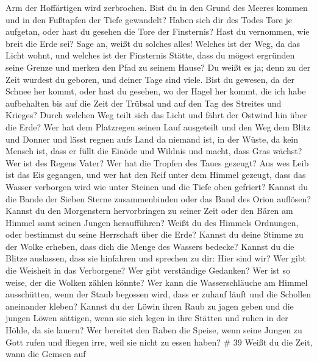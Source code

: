 Arm der Hoffärtigen wird zerbrochen.  Bist du in den Grund
des Meeres kommen und in den Fußtapfen der Tiefe gewandelt?
 Haben sich dir des Todes Tore je aufgetan, oder hast du
gesehen die Tore der Finsternis?  Hast du vernommen, wie
breit die Erde sei? Sage an, weißt du solches alles! 
Welches ist der Weg, da das Licht wohnt, und welches ist der Finsternis
Stätte,  dass du mögest ergründen seine Grenze und merken
den Pfad zu seinem Hause?  Du weißt es ja; denn zu der Zeit
wurdest du geboren, und deiner Tage sind viele.  Bist du
gewesen, da der Schnee her kommt, oder hast du gesehen, wo der Hagel her
kommt,  die ich habe aufbehalten bis auf die Zeit der
Trübsal und auf den Tag des Streites und Krieges?  Durch
welchen Weg teilt sich das Licht und fährt der Ostwind hin über die
Erde?  Wer hat dem Platzregen seinen Lauf ausgeteilt und
den Weg dem Blitz und Donner  und lässt regnen aufs Land da
niemand ist, in der Wüste, da kein Mensch ist,  dass er
füllt die Einöde und Wildnis und macht, dass Gras wächst? 
Wer ist des Regens Vater? Wer hat die Tropfen des Taues gezeugt?
 Aus wes Leib ist das Eis gegangen, und wer hat den Reif
unter dem Himmel gezeugt,  dass das Wasser verborgen wird
wie unter Steinen und die Tiefe oben gefriert?  Kannst du
die Bande der Sieben Sterne zusammenbinden oder das Band des Orion
auflösen?  Kannst du den Morgenstern hervorbringen zu
seiner Zeit oder den Bären am Himmel samt seinen Jungen heraufführen?
 Weißt du des Himmels Ordnungen, oder bestimmst du seine
Herrschaft über die Erde?  Kannst du deine Stimme zu der
Wolke erheben, dass dich die Menge des Wassers bedecke? 
Kannst du die Blitze auslassen, dass sie hinfahren und sprechen zu dir:
Hier sind wir?  Wer gibt die Weisheit in das Verborgene?
Wer gibt verständige Gedanken?  Wer ist so weise, der die
Wolken zählen könnte? Wer kann die Wasserschläuche am Himmel
ausschütten,  wenn der Staub begossen wird, dass er zuhauf
läuft und die Schollen aneinander kleben?  Kannst du der
Löwin ihren Raub zu jagen geben und die jungen Löwen sättigen,
 wenn sie sich legen in ihre Stätten und ruhen in der
Höhle, da sie lauern?  Wer bereitet den Raben die Speise,
wenn seine Jungen zu Gott rufen und fliegen irre, weil sie nicht zu
essen haben? \# 39  Weißt du die Zeit, wann die Gemsen auf
